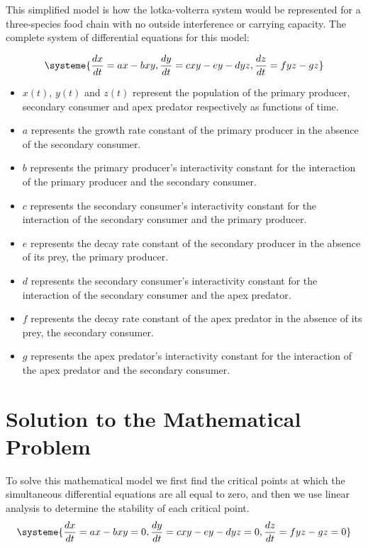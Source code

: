 \documentclass[11pt,oneside]{article}
\begin{document}
	This simplified model is how the lotka-volterra system would be represented for a three-species food chain with no outside interference or carrying capacity. The complete system of differential equations for this model:
	
	\begin{equation}
	\systeme{
		\frac{dx}{dt} = ax - bxy,
		\frac{dy}{dt} = cxy - ey -dyz,
		\frac{dz}{dt} = fyz - gz
	}
	\end{equation}
	\begin{itemize}
		\item $x(t)$, $y(t)$ and $z(t)$ represent the population of the primary producer, secondary consumer and apex predator respectively as functions of time.
		\item $a$ represents the growth rate constant of the primary producer in the absence of the secondary consumer.
		\item $b$ represents the primary producer's interactivity constant for the interaction of the primary producer and the secondary consumer.
		\item $c$ represents the secondary consumer's interactivity constant for the interaction of the secondary consumer and the primary producer.
		\item $e$ represents the decay rate constant of the secondary producer in the absence of its prey, the primary producer.
		\item $d$ represents the secondary consumer's interactivity constant for the interaction of the secondary consumer and the apex predator.
		\item $f$ represents the decay rate constant of the apex predator in the absence of its prey, the secondary consumer.
		\item $g$ represents the apex predator's interactivity constant for the interaction of the apex predator and the secondary consumer.
	\end{itemize}
	
	
	\section{Solution to the Mathematical Problem}
	To solve this mathematical model we first find the critical points at which the simultaneous differential equations are all equal to zero, and then we use linear analysis to determine the stability of each critical point. 
	\begin{equation}
	\systeme{
		\frac{dx}{dt} = ax - bxy = 0,
		\frac{dy}{dt} = cxy - ey -dyz = 0,
		\frac{dz}{dt} = fyz - gz = 0
	}
	\end{equation}
	
\end{document}
